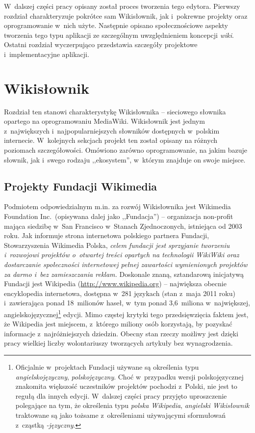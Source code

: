 \documentclass{pracamgr}
\begin{document}
W~dalszej części pracy opisany został proces tworzenia tego edytora. Pierwszy rozdział charakteryzuje pokrótce sam Wikisłownik, jak i~pokrewne projekty oraz oprogramowanie w~nich użyte. Następnie opisano społecznościowe aspekty tworzenia tego typu aplikacji ze szczególnym uwzględnieniem koncepcji \emph{wiki}. Ostatni rozdział wyczerpująco przedstawia szczegóły projektowe i~implementacyjne aplikacji.

\chapter{Wikisłownik}
Rozdział ten stanowi charakterystykę Wikisłownika -- sieciowego słownika opartego na oprogramowaniu MediaWiki. Wikisłownik jest jednym z~największych i~najpopularniejszych słowników dostępnych w~polskim internecie. W~kolejnych sekcjach projekt ten został opisany na różnych poziomach szczegółowości. Omówiono zarówno oprogramowanie, na jakim bazuje słownik, jak i~swego rodzaju ,,ekosystem'', w~którym znajduje on swoje miejsce.

\section{Projekty Fundacji Wikimedia}
Podmiotem odpowiedzialnym m.in. za rozwój Wikisłownika jest Wikimedia Foundation Inc.\ (opisywana dalej jako ,,Fundacja'') -- organizacja non-profit mająca siedzibę w~San Francisco w~Stanach Zjednoczonych, istniejąca od 2003 roku. Jak informuje strona internetowa polskiego partnera Fundacji, Stowarzyszenia Wikimedia Polska, \emph{celem fundacji jest sprzyjanie tworzeniu i~rozwojowi projektów o~otwartej treści opartych na technologii WikiWiki oraz dostarczanie społeczności internetowej pełnej zawartości wymienionych projektów za darmo i~bez zamieszczania reklam.} %
Doskonale znaną, sztandarową inicjatywą Fundacji jest Wikipedia (\protect\url{http://www.wikipedia.org}) -- największa obecnie encyklopedia internetowa, dostępna w~281 językach (stan z~maja 2011 roku) i~zawierająca ponad 18~milionów haseł, w~tym ponad 3,6~miliona w~największej, angielskojęzycznej\footnote{Oficjalnie w~projektach Fundacji używane są określenia typu \emph{angielskojęzyczny}, \emph{polskojęzyczny}. Choć w~przypadku wersji polskojęzycznej znakomita większość uczestników projektów pochodzi z~Polski, nie jest to regułą dla innych edycji. W~dalszej części pracy przyjęto uproszczenie polegające na tym, że określenia typu \emph{polska Wikipedia}, \emph{angielski Wikisłownik} traktowane są jako tożsame z~określeniami używającymi sformułowań z~cząstką \emph{-języczny}.} edycji. Mimo częstej krytyki tego przedsięwzięcia faktem jest, że Wikipedia jest miejscem, z~którego miliony osób korzystają, by pozyskać informacje z~najróżniejszych dziedzin. Obecny stan rzeczy możliwy jest dzięki pracy wielkiej liczby wolontariuszy tworzących artykuły bez wynagrodzenia.
\end{document}
